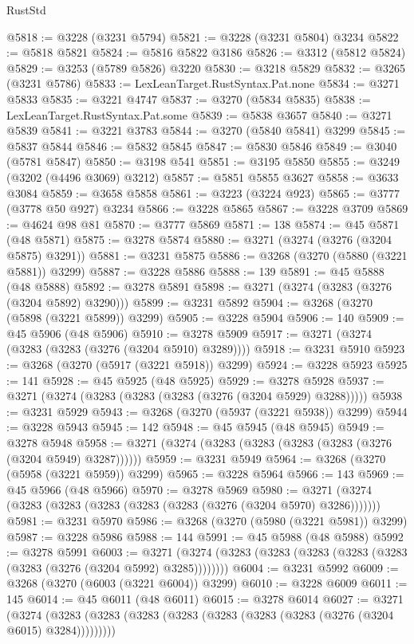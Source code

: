 \begin{lexlean}{RustStd}
\begin{coremodule}
@5818 := @3228 (@3231 @5794)
@5821 := @3228 (@3231 @5804) @3234
@5822 := @5818 @5821
@5824 := @5816 @5822 @3186
@5826 := @3312 (@5812 @5824)
@5829 := @3253 (@5789 @5826) @3220
@5830 := @3218 @5829
@5832 := @3265 (@3231 @5786)
@5833 := LexLeanTarget.RustSyntax.Pat.none
@5834 := @3271 @5833
@5835 := @3221 @4747
@5837 := @3270 (@5834 @5835)
@5838 := LexLeanTarget.RustSyntax.Pat.some
@5839 := @5838 @3657
@5840 := @3271 @5839
@5841 := @3221 @3783
@5844 := @3270 (@5840 @5841) @3299
@5845 := @5837 @5844
@5846 := @5832 @5845
@5847 := @5830 @5846
@5849 := @3040 (@5781 @5847)
@5850 := @3198 @541
@5851 := @3195 @5850
@5855 := @3249 (@3202 (@4496 @3069) @3212)
@5857 := @5851 @5855 @3627
@5858 := @3633 @3084
@5859 := @3658 @5858
@5861 := @3223 (@3224 @923)
@5865 := @3777 (@3778 @50 @927) @3234
@5866 := @3228 @5865
@5867 := @3228 @3709
@5869 := @4624 @98 @81
@5870 := @3777 @5869
@5871 := 138
@5874 := @45 @5871 (@48 @5871)
@5875 := @3278 @5874
@5880 := @3271 (@3274 (@3276 (@3204 @5875) @3291))
@5881 := @3231 @5875
@5886 := @3268 (@3270 (@5880 (@3221 @5881)) @3299)
@5887 := @3228 @5886
@5888 := 139
@5891 := @45 @5888 (@48 @5888)
@5892 := @3278 @5891
@5898 := @3271 (@3274 (@3283 (@3276 (@3204 @5892) @3290)))
@5899 := @3231 @5892
@5904 := @3268 (@3270 (@5898 (@3221 @5899)) @3299)
@5905 := @3228 @5904
@5906 := 140
@5909 := @45 @5906 (@48 @5906)
@5910 := @3278 @5909
@5917 := @3271 (@3274 (@3283 (@3283 (@3276 (@3204 @5910) @3289))))
@5918 := @3231 @5910
@5923 := @3268 (@3270 (@5917 (@3221 @5918)) @3299)
@5924 := @3228 @5923
@5925 := 141
@5928 := @45 @5925 (@48 @5925)
@5929 := @3278 @5928
@5937 := @3271 (@3274 (@3283 (@3283 (@3283 (@3276 (@3204 @5929) @3288)))))
@5938 := @3231 @5929
@5943 := @3268 (@3270 (@5937 (@3221 @5938)) @3299)
@5944 := @3228 @5943
@5945 := 142
@5948 := @45 @5945 (@48 @5945)
@5949 := @3278 @5948
@5958 := @3271 (@3274 (@3283 (@3283 (@3283 (@3283 (@3276 (@3204 @5949) @3287))))))
@5959 := @3231 @5949
@5964 := @3268 (@3270 (@5958 (@3221 @5959)) @3299)
@5965 := @3228 @5964
@5966 := 143
@5969 := @45 @5966 (@48 @5966)
@5970 := @3278 @5969
@5980 := @3271 (@3274 (@3283 (@3283 (@3283 (@3283 (@3283 (@3276 (@3204 @5970) @3286)))))))
@5981 := @3231 @5970
@5986 := @3268 (@3270 (@5980 (@3221 @5981)) @3299)
@5987 := @3228 @5986
@5988 := 144
@5991 := @45 @5988 (@48 @5988)
@5992 := @3278 @5991
@6003 := @3271 (@3274 (@3283 (@3283 (@3283 (@3283 (@3283 (@3283 (@3276 (@3204 @5992) @3285))))))))
@6004 := @3231 @5992
@6009 := @3268 (@3270 (@6003 (@3221 @6004)) @3299)
@6010 := @3228 @6009
@6011 := 145
@6014 := @45 @6011 (@48 @6011)
@6015 := @3278 @6014
@6027 := @3271
    (@3274 (@3283 (@3283 (@3283 (@3283 (@3283 (@3283 (@3283 (@3276 (@3204 @6015) @3284)))))))))

\end{coremodule}
\end{lexlean}
